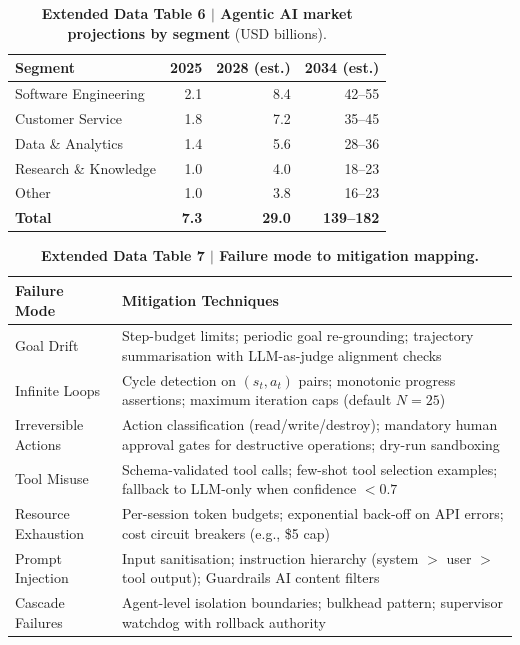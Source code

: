 \documentclass[10pt]{article}
\begin{document}
\begin{table}[ht]
\centering
\caption*{\textbf{Extended Data Table 6 $|$ Agentic AI market projections by segment} (USD billions).}
\begin{tabular}{lrrr}
\toprule
\textbf{Segment} & \textbf{2025} & \textbf{2028 (est.)} & \textbf{2034 (est.)} \\
\midrule
Software Engineering    & 2.1  & 8.4   & 42--55 \\
Customer Service        & 1.8  & 7.2   & 35--45 \\
Data \& Analytics       & 1.4  & 5.6   & 28--36 \\
Research \& Knowledge   & 1.0  & 4.0   & 18--23 \\
Other                   & 1.0  & 3.8   & 16--23 \\
\midrule
\textbf{Total}          & \textbf{7.3} & \textbf{29.0} & \textbf{139--182} \\
\bottomrule
\end{tabular}
\end{table}

\begin{table}[ht]
\centering
\caption*{\textbf{Extended Data Table 7 $|$ Failure mode to mitigation mapping.}}
\begin{tabular}{p{2.5cm}p{9cm}}
\toprule
\textbf{Failure Mode} & \textbf{Mitigation Techniques} \\
\midrule
Goal Drift & Step-budget limits; periodic goal re-grounding; trajectory summarisation with LLM-as-judge alignment checks \\
Infinite Loops & Cycle detection on $(s_t, a_t)$ pairs; monotonic progress assertions; maximum iteration caps (default $N{=}25$) \\
Irreversible Actions & Action classification (read/write/destroy); mandatory human approval gates for destructive operations; dry-run sandboxing \\
Tool Misuse & Schema-validated tool calls; few-shot tool selection examples; fallback to LLM-only when confidence $< 0.7$ \\
Resource Exhaustion & Per-session token budgets; exponential back-off on API errors; cost circuit breakers (e.g., \$5 cap) \\
Prompt Injection & Input sanitisation; instruction hierarchy (system $>$ user $>$ tool output); Guardrails AI content filters \\
Cascade Failures & Agent-level isolation boundaries; bulkhead pattern; supervisor watchdog with rollback authority \\
\bottomrule
\end{tabular}
\end{table}
\end{document}
